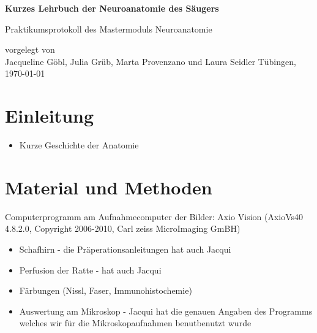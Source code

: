 \documentclass[12pt,a4paper,pdftex]{article}
\begin{document}
\setlength{\parindent}{0pt}


\begin{titlepage}
 \begin{center}
        \vspace*{1cm}
        \LARGE
        \textbf{Kurzes Lehrbuch der Neuroanatomie des Säugers}
        \vspace{2cm}
        
        \Large
        Praktikumsprotokoll des Mastermoduls Neuroanatomie
        \vspace{4cm}
        
        \large
        vorgelegt von \\ Jacqueline Göbl, Julia Grüb, Marta Provenzano und Laura Seidler %
        \vfill
        \large     
        T\"ubingen, \today
    \end{center}
    \newpage
        \thispagestyle{empty}
        \mbox{}
        \newpage
\end{titlepage}


\thispagestyle{empty}
\mbox{}

\tableofcontents
\newpage
\listoffigures


\newpage
\section{Einleitung}
\begin{itemize}
    \item Kurze Geschichte der Anatomie
\end{itemize}
\newpage
\section{Material und Methoden}

Computerprogramm am Aufnahmecomputer der Bilder:
Axio Vision (AxioVs40 4.8.2.0, Copyright 2006-2010, Carl zeiss MicroImaging GmBH)



\begin{itemize}
    \item Schafhirn - die Präperationsanleitungen hat auch Jacqui
    \item Perfusion der Ratte - hat auch Jacqui
    \item Färbungen (Nissl, Faser, Immunohistochemie)
    \item Auswertung am Mikroskop - Jacqui hat die genauen Angaben des Programms welches wir für die Mikroskopaufnahmen benutbenutzt wurde
\end{itemize}
\end{document}
